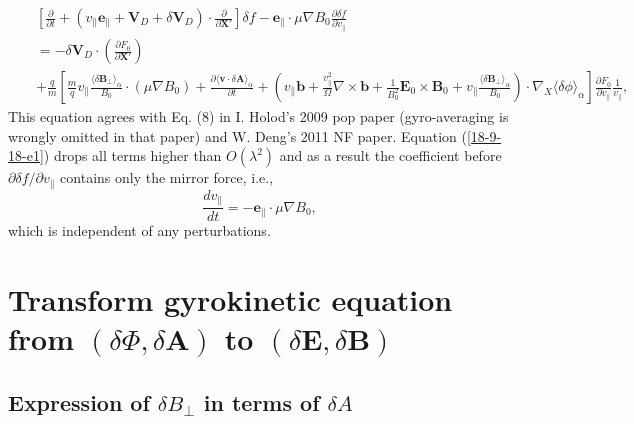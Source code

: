 \documentclass{llncs}
\begin{document}
\begin{eqnarray}
  &  & \left[ \frac{\partial}{\partial t} + (v_{\parallel}
  \mathbf{e}_{\parallel} +\mathbf{V}_D + \delta \mathbf{V}_D) \cdot
  \frac{\partial}{\partial \mathbf{X}'} \right] \delta f
  -\mathbf{e}_{\parallel} \cdot \mu \nabla B_0 \frac{\partial \delta
  f}{\partial v_{\parallel}} \nonumber\\
  &  & = - \delta \mathbf{V}_D \cdot \left( \frac{\partial F_0}{\partial
  \mathbf{X}'} \right) \nonumber\\
  &  & + \frac{q}{m} \left[ \frac{m}{q} v_{\parallel} \frac{\langle \delta
  \mathbf{B}_{\perp} \rangle_{\alpha}}{B_0} \cdot (\mu \nabla B_0) +
  \frac{\partial \langle \mathbf{v} \cdot \delta \mathbf{A}
  \rangle_{\alpha}}{\partial t} + \left( v_{\parallel} \mathbf{b}+
  \frac{v_{\parallel}^2}{\Omega} \nabla \times \mathbf{b}+ \frac{1}{B_0^2}
  \mathbf{E}_0 \times \mathbf{B}_0 + v_{\parallel} \frac{\langle \delta
  \mathbf{B}_{\perp} \rangle_{\alpha}}{B_0} \right) \cdot \nabla_X \langle
  \delta \phi \rangle_{\alpha} \right] \frac{\partial F_0}{\partial
  v_{\parallel}}  \frac{1}{v_{\parallel}},  \label{18-9-18-e1}
\end{eqnarray}
This equation agrees with Eq. (8) in I. Holod's 2009 pop paper (gyro-averaging
is wrongly omitted in that paper) and W. Deng's 2011 NF paper. Equation
(\ref{18-9-18-e1}) drops all terms higher than $O (\lambda^2)$ and as a result
the coefficient before $\partial \delta f / \partial v_{\parallel}$ contains
only the mirror force, i.e.,
\begin{equation}
  \frac{d v_{\parallel}}{d t} = -\mathbf{e}_{\parallel} \cdot \mu \nabla B_0,
\end{equation}
which is independent of any perturbations.

\section{Transform gyrokinetic equation from $(\delta \Phi, \delta
\mathbf{A})$ to $(\delta \mathbf{E}, \delta \mathbf{B})$}

\subsection{Expression of $\delta B_{\perp}$ in terms of $\delta A$}
\end{document}
